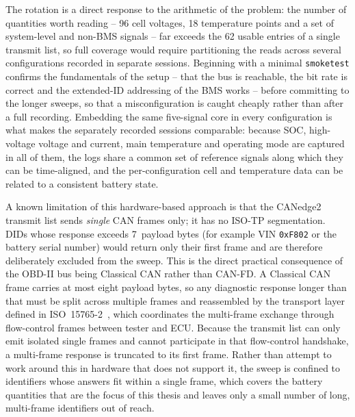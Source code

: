 \documentclass[11pt,a4paper,oneside,parskip=half]{scrreprt}
\providecommand{\hex}{}\renewcommand{\hex}[1]{\texttt{0x#1}}
\begin{document}
The rotation is a direct response to the arithmetic of the problem: the number of quantities worth reading -- 96 cell voltages, 18 temperature points and a set of system-level and non-BMS signals -- far exceeds the 62 usable entries of a single transmit list, so full coverage would require partitioning the reads across several configurations recorded in separate sessions. Beginning with a minimal \texttt{smoketest} confirms the fundamentals of the setup -- that the bus is reachable, the bit rate is correct and the extended-ID addressing of the BMS works -- before committing to the longer sweeps, so that a misconfiguration is caught cheaply rather than after a full recording. Embedding the same five-signal core in every configuration is what makes the separately recorded sessions comparable: because SOC, high-voltage voltage and current, main temperature and operating mode are captured in all of them, the logs share a common set of reference signals along which they can be time-aligned, and the per-configuration cell and temperature data can be related to a consistent battery state.

A known limitation of this hardware-based approach is that the CANedge2 transmit list sends \emph{single} CAN frames only; it has no ISO-TP segmentation. DIDs whose response exceeds 7~payload bytes (for example VIN \hex{F802} or the battery serial number) would return only their first frame and are therefore deliberately excluded from the sweep. This is the direct practical consequence of the OBD-II bus being Classical CAN rather than CAN-FD. A Classical CAN frame carries at most eight payload bytes, so any diagnostic response longer than that must be split across multiple frames and reassembled by the transport layer defined in ISO~15765-2~\cite{iso15765}, which coordinates the multi-frame exchange through flow-control frames between tester and ECU. Because the transmit list can only emit isolated single frames and cannot participate in that flow-control handshake, a multi-frame response is truncated to its first frame. Rather than attempt to work around this in hardware that does not support it, the sweep is confined to identifiers whose answers fit within a single frame, which covers the battery quantities that are the focus of this thesis and leaves only a small number of long, multi-frame identifiers out of reach.


\end{document}
